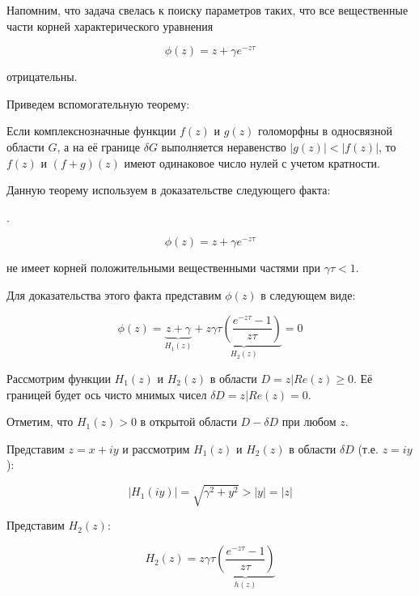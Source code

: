 Напомним, что задача свелась к поиску параметров таких, что все вещественные части корней характерического уравнения

\begin{equation}
\phi(z) = z + \gamma e^{-z \tau}
\end{equation}

отрицательны.

Приведем вспомогательную теорему:

 Если комплекснозначные функции $f(z)$ и $g(z)$ голоморфны в односвязной области $G$, а на её границе $\delta G$ выполняется неравенство $|g(z)| < |f(z)|$, то $f(z)$ и $(f+g)(z)$ имеют одинаковое число нулей с учетом кратности.

Данную теорему используем в доказательстве следующего факта:

.

\begin{equation*}
\phi(z) = z + \gamma e^{-z \tau}
\end{equation*}

не имеет корней положительными вещественными частями при $\gamma \tau < 1$.

Для доказательства этого факта представим $\phi (z)$ в следующем виде:

\begin{equation}
\phi(z) = \underbrace{{z + \gamma}}_{H_1(z)} + \underbrace{z \gamma \tau \left(\dfrac{e^{-z \tau} - 1}{z \tau} \right)}_{H_2(z)} = 0
\end{equation}

Рассмотрим функции $H_1(z)$ и $H_2(z)$ в области $D = {z|Re(z) \geq 0}$. Её границей будет ось чисто мнимых чисел $\delta D = {z|Re(z)=0}$.

Отметим, что $H_1(z)>0$ в открытой области $D-\delta D$ при любом $z$.

Представим $z=x+iy$ и рассмотрим $H_1(z)$ и $H_2(z)$ в области $\delta D$ (т.е. $z=iy$):

\begin{equation}\label{eq:h1}
|H_1(iy)| = \sqrt{\gamma^2 + y^2} > |y| = |z|
\end{equation}

Представим $H_2(z)$:

\begin{equation}
H_2(z) = z \gamma \tau \underbrace{\left(\dfrac{e^{-z \tau} - 1}{z \tau} \right)}_{h(z)}
\end{equation}


